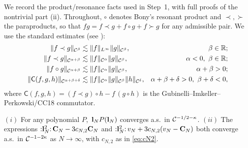We record the product/resonance facts used in Step~1, with full proofs of the
nontrivial part (ii). Throughout, $\circ$ denotes Bony's resonant product and
$\prec,\succ$ the para\-products, so that $fg=f\prec g+f\circ g+f\succ g$ for any
admissible pair. We use the standard estimates (see \cite{CC18,Hairer14}):
\begin{align}
\|f\prec g\|_{\mathcal{C}^{\beta}}&\lesssim\|f\|_{L^\infty}\|g\|_{\mathcal{C}^{\beta}}, &\beta\in\mathbb{R};\label{eq:para1}\\
\|f\prec g\|_{\mathcal{C}^{\alpha+\beta}}&\lesssim\|f\|_{\mathcal{C}^{\alpha}}\|g\|_{\mathcal{C}^{\beta}}, &\alpha<0,\ \beta\in\mathbb{R};\label{eq:para2}\\
\|f\circ g\|_{\mathcal{C}^{\alpha+\beta}}&\lesssim\|f\|_{\mathcal{C}^{\alpha}}\|g\|_{\mathcal{C}^{\beta}}, &\alpha+\beta>0;\label{eq:res}\\
\|\mathsf C(f,g,h)\|_{\mathcal{C}^{\alpha+\beta+\delta}}&\lesssim\|f\|_{\mathcal{C}^{\alpha}}\|g\|_{\mathcal{C}^{\beta}}\|h\|_{\mathcal{C}^{\delta}}, &\alpha+\beta+\delta>0,\ \beta+\delta<0,\label{eq:comm}
\end{align}
where $\mathsf C(f,g,h)=(f\prec g)\circ h-f\,(g\circ h)$ is the Gubinelli--Imkeller--Perkowski/CC18 commutator.

\begin{qonelemma}\label{lem:std}
$(i)$ For any polynomial $P$, $\,\mathbf{l}_N P(\mathbf{l}_N)$ converges a.s.\ in
$\mathcal{C}^{-1/2-\kappa}$. $(ii)$ The expressions ${:}\mathbf{l}_N^2{:}\,\mathbf{C}_N-3c_{N,2}\mathbf{C}_N$
and ${:}\mathbf{l}_N^2{:}\,v_N+3c_{N,2}(v_N-\mathbf{C}_N)$ both converge a.s.\ in
$\mathcal{C}^{-1-2\kappa}$ as $N\to\infty$, with $c_{N,2}$ as in \eqref{eq:cN2}.
\end{qonelemma}

